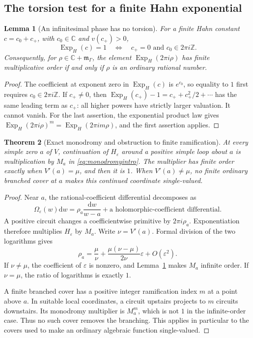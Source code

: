 \documentclass[11pt,a4paper]{article}
\numberwithin{equation}{section}
\newtheorem{theorem}{Theorem}[section]
\newtheorem{lemma}[theorem]{Lemma}
\theoremstyle{definition}
\theoremstyle{remark}
\newcommand{\C}{\mathbb C}
\newcommand{\Z}{\mathbb Z}
\newcommand{\m}{\mathfrak m_\Gamma}
\newcommand{\eps}{\varepsilon}
\newcommand{\dd}{\mathrm d}
\newcommand{\ExpH}{\operatorname{Exp}_{\!H}}
\begin{document}
\subsection{The torsion test for a finite Hahn exponential}

\begin{lemma}[An infinitesimal phase has no torsion]
\label{lem:torsion}
For a finite Hahn constant $c=c_0+c_+$, with $c_0\in\C$ and $v(c_+)>0$,
\[
 \ExpH(c)=1\quad\Longleftrightarrow\quad c_+=0
       \text{ and }c_0\in2\pi i\Z.
\]
Consequently, for $\rho\in\C+\m$, the element $\ExpH(2\pi i\rho)$ has
finite multiplicative order if and only if $\rho$ is an ordinary rational
number.
\end{lemma}

\begin{proof}
The coefficient at exponent zero in $\ExpH(c)$ is $e^{c_0}$, so equality
to $1$ first requires $c_0\in2\pi i\Z$.  If $c_+\ne0$, then
$\ExpH(c_+)-1=c_++c_+^2/2+\cdots$ has the same leading term as $c_+$:
all higher powers have strictly larger valuation.  It cannot vanish.
For the last assertion, the exponential product law gives
$\ExpH(2\pi i\rho)^m=\ExpH(2\pi i m\rho)$, and the first assertion applies.
\end{proof}

\begin{theorem}[Exact monodromy and obstruction to finite ramification]
\label{thm:monodromy}
At every simple zero $a$ of $V$, continuation of $H_\eps$ around a positive
simple loop about $a$ is multiplication by $M_a$ in
\eqref{eq:monodromyintro}.  The multiplier has finite order exactly when
$V'(a)=\mu$, and then it is $1$.  When $V'(a)\ne\mu$, no finite ordinary
branched cover at $a$ makes this continued coordinate single-valued.
\end{theorem}

\begin{proof}
Near $a$, the rational-coefficient differential decomposes as
\[
 \Omega_\eps(w)\dd w
     =\rho_a\frac{\dd w}{w-a}+\text{a holomorphic-coefficient differential}.
\]
A positive circuit changes a coefficientwise primitive by $2\pi i\rho_a$.
Exponentiation therefore multiplies $H_\eps$ by $M_a$.
Write $\nu=V'(a)$.  Formal division of the two logarithms gives
\begin{equation}\label{eq:rhofirst}
 \rho_a=\frac\mu\nu+
          \frac{\mu(\nu-\mu)}{2\nu}\eps+O(\eps^2).
\end{equation}
If $\nu\ne\mu$, the coefficient of $\eps$ is nonzero, and
Lemma~\ref{lem:torsion} makes $M_a$ infinite order.  If $\nu=\mu$, the ratio
of logarithms is exactly $1$.

A finite branched cover has a positive integer ramification index $m$ at a
point above $a$.  In suitable local coordinates, a circuit upstairs
projects to $m$ circuits downstairs.  Its monodromy multiplier is $M_a^m$,
which is not $1$ in the infinite-order case.  Thus no such cover removes
the branching.  This applies in particular to the covers used to make an
ordinary algebraic function single-valued.
\end{proof}
\end{document}
